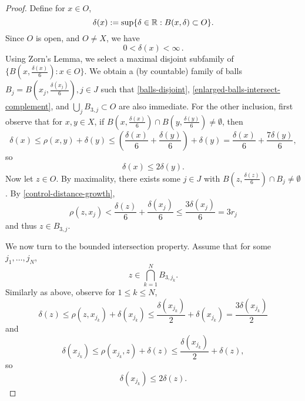 \begin{proof}
\leanok
Define for $x\in O$,
\begin{equation}
    \delta(x):= \sup \{\delta\in{\mathbb{R}} : B(x,\delta)\subset O\}.
\end{equation}
Since $O$ is open, and $O\ne X$, we have
\begin{equation}
    0 < \delta(x) < \infty \,.
\end{equation}
Using Zorn's Lemma, we select a maximal disjoint subfamily of $\{B(x,\frac{\delta(x)}{6}) : x \in O\}$.
We obtain a (by  countable) family of balls $B_j = B(x_j, \frac{\delta(x_j)}{6}), j \in J$ such that \eqref{balls-disjoint}, \eqref{enlarged-balls-intersect-complement}, and $\bigcup_j B_{3,j} \subset O$ are also immediate. For the other inclusion, first observe that for $x,y\in X$,  if $B(x,\frac{\delta(x)}{6}) \cap B(y,\frac{\delta(y)}{6}) \ne \emptyset$, then
\begin{equation*}
    \delta(x) \le \rho(x,y) + \delta(y) \le (\frac{\delta(x)}{6} + \frac{\delta(y)}{6}) + \delta(y) = \frac{\delta(x)}{6} + \frac{7\delta(y)}{6},
\end{equation*}
so
\begin{equation}
    \label{control-distance-growth}
    \delta(x) \le 2 \delta(y).
\end{equation}
Now let $z\in O$. By maximality, there exists some $j\in J$ with $B(z,\frac{\delta(z)}{6}) \cap B_j \ne \emptyset$. By \eqref{control-distance-growth},
\begin{equation*}
    \rho(z,x_j)< \frac{\delta(z)}{6} + \frac{\delta(x_j)}{6} \le \frac{3\delta(x_j)}{6} = 3r_j
\end{equation*}
and thus $z\in B_{3,j}$.

We now turn to the bounded intersection property. Assume that for some $j_1,\dots,j_N$,
\begin{equation}
    z\in \bigcap_{k=1}^N B_{3,j_k}.
\end{equation}
Similarly as above, observe for $1\le k \le N$,
\begin{equation}
    \label{control-distance-growth-b}
    \delta(z) \le \rho(z,x_{j_k}) + \delta(x_{j_k}) \le \frac{\delta(x_{j_k})}{2} + \delta(x_{j_k}) = \frac{3\delta(x_{j_k})}{2}
\end{equation}
and
\begin{equation*}
    \delta(x_{j_k}) \le \rho(x_{j_k},z) + \delta(z) \le \frac{\delta(x_{j_k})}{2} + \delta(z),
\end{equation*}
so
\begin{equation}
    \label{control-distance-growth-c}
    \delta(x_{j_k}) \le 2 \delta(z).
\end{equation}


\end{proof}
